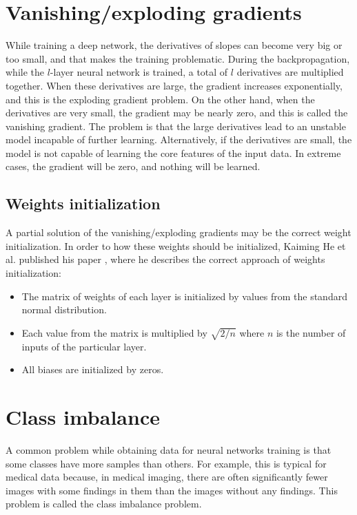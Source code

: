 \documentclass[thesis=B,english]{FITthesis}[2019/12/23]
\begin{document}
\section{Vanishing/exploding gradients}

While training a deep network, the derivatives of slopes can become very big or too small, and that makes the training problematic. During the backpropagation, while the $l$-layer neural network is trained, a total of $l$ derivatives are multiplied together. When these derivatives are large, the gradient increases exponentially, and this is the exploding gradient problem. On the other hand, when the derivatives are very small, the gradient may be nearly zero, and this is called the vanishing gradient. The problem is that the large derivatives lead to an unstable model incapable of further learning. Alternatively, if the derivatives are small, the model is not capable of learning the core features of the input data. In extreme cases, the gradient will be zero, and nothing will be learned.\cite{van_exp_gradients}

\subsection{Weights initialization}

A partial solution of the vanishing/exploding gradients may be the correct weight initialization. In order to how these weights should be initialized, Kaiming He et al. published his paper \cite{DBLP:journals/corr/HeZR015}, where he describes the correct approach of weights initialization:
\begin{itemize}
	\item The matrix of weights of each layer is initialized by values from the standard normal distribution.
	\item Each value from the matrix is multiplied by $\sqrt{2/n}$ where $n$ is the number of inputs of the particular layer.
	\item All biases are initialized by zeros.
\end{itemize}

\section{Class imbalance}
A common problem while obtaining data for neural networks training is that some classes have more samples than others. For example, this is typical for medical data because, in medical imaging, there are often significantly fewer images with some findings in them than the images without any findings. This problem is called the class imbalance problem. 
\end{document}
